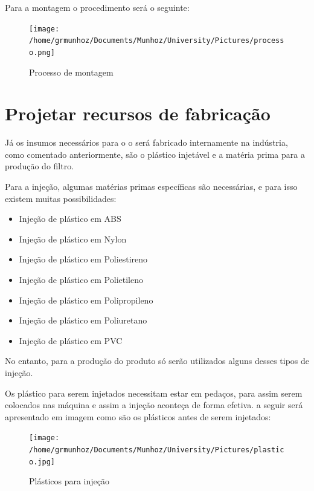 \documentclass[
	12pt,				%
	openright,			%
	oneside,			%
	a4paper,			%
	english,			%
	french,				%
	spanish,			%
	brazil				%
	]{abntex2}
\begin{document}
Para a montagem o procedimento será o seguinte:
\begin{figure}[H]
\begin{center}
\caption{Processo de montagem}
\texttt{[image: /home/grmunhoz/Documents/Munhoz/University/Pictures/processo.png]} 
\label{figetapas}
\end{center}
\end{figure}

\section{Projetar recursos de fabricação}

Já os insumos necessários para o o será fabricado internamente na indústria, como comentado anteriormente, são o plástico injetável e a matéria prima para a produção do filtro. 

Para a injeção, algumas matérias primas específicas são necessárias, e para isso existem muitas possibilidades:

\begin{itemize}
\item Injeção de plástico em ABS
\item Injeção de plástico em Nylon
\item Injeção de plástico em Poliestireno
\item Injeção de plástico em Polietileno
\item Injeção de plástico em Polipropileno
\item Injeção de plástico em Poliuretano
\item Injeção de plástico em PVC
\end{itemize}

No entanto, para a produção do produto só serão utilizados alguns desses tipos de injeção.

Os plástico para serem injetados necessitam estar em pedaços, para assim serem colocados nas máquina e assim a injeção aconteça de forma efetiva. a seguir será apresentado em imagem como são os plásticos antes de serem injetados:

\begin{figure}[H]
\begin{center}
\caption{Plásticos para injeção}
\texttt{[image: /home/grmunhoz/Documents/Munhoz/University/Pictures/plastico.jpg]} 
\label{figetapas}
\end{center}
\end{figure}
\end{document}
